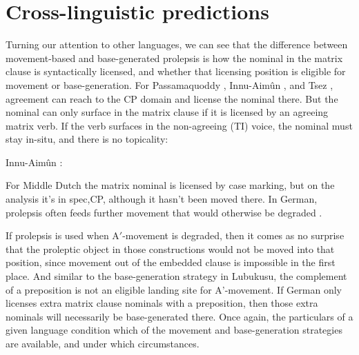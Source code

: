 \documentclass[output=paper,colorlinks,citecolor=brown]{langscibook}
\begin{document}
\section{Cross-linguistic predictions}\label{sec:newkirk:5}

Turning our attention to other languages, we can see that the difference between movement-based and base-generated prolepsis is how the nominal in the matrix clause is syntactically licensed, and whether that licensing position is eligible for movement or base-generation. For Passamaquoddy \citep{Bruening2001},  Innu-Aimûn \citep{BraniganMacKenzie2002}, and Tsez \citep{PolinskyPotsdam2001}, agreement can reach to the CP domain and license the nominal there. But the nominal can only surface in the matrix clause if it is licensed by an agreeing matrix verb. If the verb surfaces in the non-agreeing (TI) voice, the nominal must stay in-situ, and there is no topicality:

\ea%
	\label{ex:newkirk:41} 
	Innu-Aimûn \citep{BraniganMacKenzie2002}: 
	\z
\z

For Middle Dutch the matrix nominal is licensed by case marking, but on the analysis \citep{VanKoppenEtAl2016} it's in spec,CP, although it hasn't been moved there. In German, prolepsis often feeds further movement that would otherwise be degraded \citep{Salzmann2017Chapter}.


If prolepsis is used when A$'$-movement is degraded, then it comes as no surprise that the proleptic object in those constructions would not be moved into that position, since movement out of the embedded clause is impossible in the first place. And similar to the base-generation strategy in Lubukusu, the complement of a preposition is not an eligible landing site for A'-movement. If German only licenses extra matrix clause nominals with a preposition, then those extra nominals will necessarily be base-generated there. Once again, the particulars of a given language condition which of the movement and base-generation strategies are available, and under which circumstances.
\end{document}
